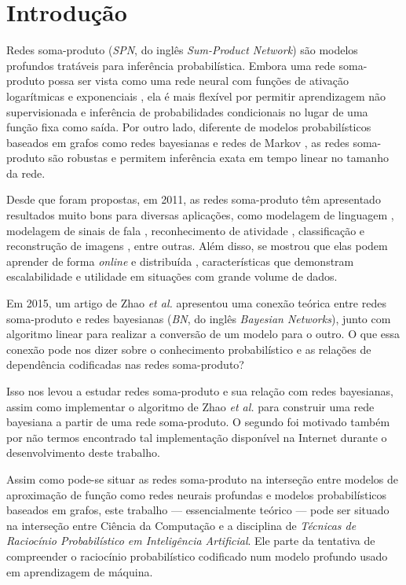 \chapter{Introdução}
\label{cap:introducao}

Redes soma-produto \cite{Poon2012} (\emph{SPN}, do inglês \emph{Sum-Product Network}) são modelos profundos tratáveis para inferência probabilística. Embora uma rede soma-produto possa ser vista como uma rede neural com funções de ativação logarítmicas e exponenciais \cite{Hsu2017}, ela é mais flexível por permitir aprendizagem não supervisionada e inferência de probabilidades condicionais no lugar de uma função fixa como saída. Por outro lado, diferente de modelos probabilísticos baseados em grafos como redes bayesianas e redes de Markov \cite{Koller2009}, as redes soma-produto são robustas e permitem inferência exata em tempo linear no tamanho da rede.

Desde que foram propostas, em 2011, as redes soma-produto têm apresentado resultados muito bons para diversas aplicações, como modelagem de linguagem \cite{Cheng2014}, modelagem de sinais de fala \cite{Peharz2014}, reconhecimento de atividade \cite{Amer2016}, classificação e reconstrução de imagens \cite{Poon2012}, entre outras. Além disso, se mostrou que elas podem aprender de forma \emph{online} \cite{Lee2013} e distribuída \cite{Rashwan2016}, características que demonstram escalabilidade e utilidade em situações com grande volume de dados.

\vspace{1em}

Em 2015, um artigo de Zhao \emph{et al.} \cite{Zhao2015} apresentou uma conexão teórica entre redes soma-produto e redes bayesianas (\emph{BN}, do inglês \emph{Bayesian Networks}), junto com algoritmo linear para realizar a conversão de um modelo para o outro. O que essa conexão pode nos dizer sobre o conhecimento probabilístico e as relações de dependência codificadas nas redes soma-produto?

Isso nos levou a estudar redes soma-produto e sua relação com redes bayesianas, assim como implementar o algoritmo de Zhao \emph{et al.} \cite{Zhao2015} para construir uma rede bayesiana a partir de uma rede soma-produto. O segundo foi motivado também por não termos encontrado tal implementação disponível na Internet durante o desenvolvimento deste trabalho.

\vspace{1em}

Assim como pode-se situar as redes soma-produto na interseção entre modelos de aproximação de função como redes neurais profundas e modelos probabilísticos baseados em grafos, este trabalho --- essencialmente teórico --- pode ser situado na interseção entre Ciência da Computação e a disciplina de \emph{Técnicas de Raciocínio Probabilístico em Inteligência Artificial}. Ele parte da tentativa de compreender o raciocínio probabilístico codificado num modelo profundo usado em aprendizagem de máquina.
